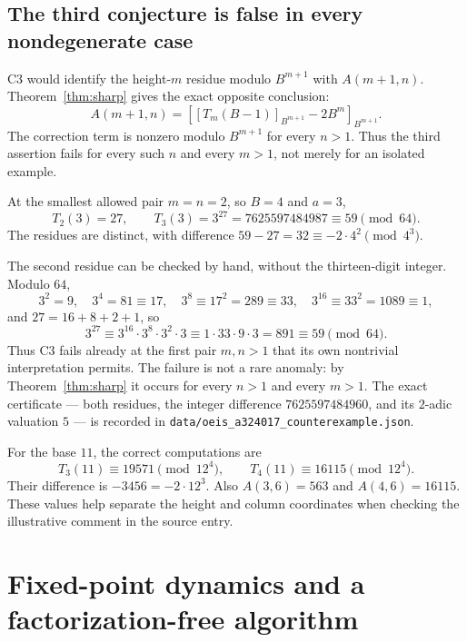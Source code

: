 \documentclass[11pt,letterpaper]{article}
\numberwithin{equation}{section}
\theoremstyle{definition}
\theoremstyle{remark}
\newcommand{\res}[2]{\left[#1\right]_{#2}}
\begin{document}
\subsection{The third conjecture is false in every nondegenerate case}\label{sec:oeis3}

C3 would identify the height-$m$ residue modulo $B^{m+1}$ with $A(m+1,n)$. Theorem~\ref{thm:sharp} gives the exact opposite conclusion:
\begin{equation}\label{eq:oeisrepair}
 \boxed{\ A(m+1,n)=
 \res{\res{T_m(B-1)}{B^{m+1}}-2B^m}{B^{m+1}}.\ }
\end{equation}
The correction term is nonzero modulo $B^{m+1}$ for every $n>1$. Thus the third assertion fails for every such $n$ and every $m>1$, not merely for an isolated example.

At the smallest allowed pair $m=n=2$, so $B=4$ and $a=3$,
\[
 T_2(3)=27,\qquad T_3(3)=3^{27}=7625597484987\equiv59\pmod{64}.
\]
The residues are distinct, with difference $59-27=32\equiv-2\cdot4^2\pmod{4^3}$.

The second residue can be checked by hand, without the thirteen-digit integer. Modulo $64$,
\[
 3^2=9,\quad 3^4=81\equiv17,\quad 3^8\equiv17^2=289\equiv33,\quad
 3^{16}\equiv33^2=1089\equiv1,
\]
and $27=16+8+2+1$, so
\[
 3^{27}\equiv3^{16}\cdot3^8\cdot3^2\cdot3
 \equiv1\cdot33\cdot9\cdot3=891\equiv59\pmod{64}.
\]
Thus C3 fails already at the first pair $m,n>1$ that its own nontrivial interpretation permits. The failure is not a rare anomaly: by Theorem~\ref{thm:sharp} it occurs for every $n>1$ and every $m>1$. The exact certificate --- both residues, the integer difference $7625597484960$, and its $2$-adic valuation $5$ --- is recorded in \texttt{data/oeis\_a324017\_counterexample.json}.

For the base $11$, the correct computations are
\[
 T_3(11)\equiv19571\pmod{12^4},\qquad
 T_4(11)\equiv16115\pmod{12^4}.
\]
Their difference is $-3456=-2\cdot12^3$. Also $A(3,6)=563$ and $A(4,6)=16115$. These values help separate the height and column coordinates when checking the illustrative comment in the source entry.

\section{Fixed-point dynamics and a factorization-free algorithm}\label{sec:algorithm}
\end{document}
